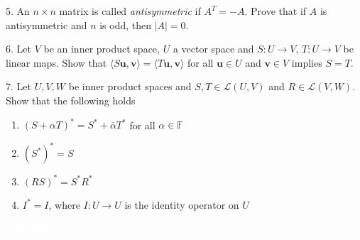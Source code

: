 \documentclass{article}
\theoremstyle{remark} %
\newcommand{\bu}{{\mathbf{u}}}
\newcommand{\bv}{{\mathbf{v}}}
\newcommand{\innerprod}[1]{\langle #1 \rangle}
\newcommand{\F}{{\mathbb{F}}}
\begin{document}
5. An $n \times n$ matrix is called \emph{antisymmetric} if $A^T = -A$. Prove that if $A$ is antisymmetric and $n$ is odd, then $|A|=0$. 

\vspace{7cm} %




6. Let $V$ be an inner product space, $U$ a vector space and $S\colon U \to V$, $T\colon U \to V$ be linear maps. Show that $\innerprod{S\bu,\bv}= \innerprod{T\bu, \bv}$ for all $\bu \in U$ and $\bv \in V$ implies $S=T$.

\vspace{10cm} %



7. Let $U,V,W$ be inner product spaces and $S,T \in \mathcal{L}(U,V)$ and $R\in \mathcal{L}(V,W)$. Show that the following holds
\begin{enumerate}
    \item $(S+\alpha T)^* = S^* + \overline{\alpha}T^*$ for all $\alpha\in \F$
    \item $(S^*)^* = S$
    \item $(RS)^* = S^*R^*$
    \item $I^* = I$, where $I \colon U \to U$ is the identity operator on $U$
\end{enumerate}

\vspace{11cm} %




\newpage
\textcolor{white}{extra page}
\end{document}
